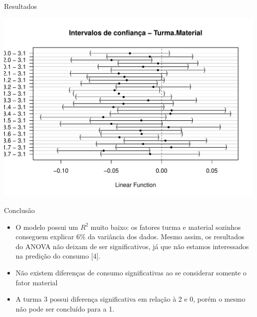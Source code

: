 \documentclass[
  ignorenonframetext,
]{beamer}
\providecommand{\tightlist}{%
  \setlength{\itemsep}{0pt}\setlength{\parskip}{0pt}}
\begin{document}
\begin{frame}{Resultados}
\protect\hypertarget{resultados-4}{}

\begin{center}\includegraphics{apresentacao_final_files/figure-beamer/effects_mpc_o2_inter-1} \end{center}

\end{frame}

\begin{frame}{Conclusão}
\protect\hypertarget{conclusao}{}

\begin{itemize}
\tightlist
\item
  O modelo possui um \(R^2\) muito baixo: os fatores turma e material
  sozinhos conseguem explicar 6\% da variância dos dados. Mesmo assim,
  os resultados do ANOVA não deixam de ser significativos, já que não
  estamos interessados na predição do consumo {[}4{]}.
\item
  Não existem diferenças de consumo significativas ao se considerar
  somente o fator material
\item
  A turma 3 possui diferença significativa em relação à 2 e 0, porém o
  mesmo não pode ser concluído para a 1.
\end{itemize}

\end{frame}
\end{document}
